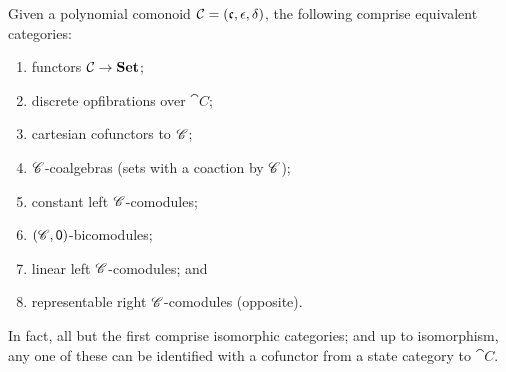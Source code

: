 \documentclass[Book-Poly]{subfiles}
\begin{document}
\begin{theorem}\label{thm.tfae_c_sets}
Given a polynomial comonoid $\mathcal{C}=(\mathfrak{c},\epsilon,\delta)$, the following comprise equivalent categories:
\begin{enumerate}
	\item functors $\mathcal{C}\to\mathbf{Set}$;
	\item discrete opfibrations over $\cat{C}$;
	\item cartesian cofunctors to $\mathscr{C}$;
	\item $\mathscr{C}$-coalgebras (sets with a coaction by $\mathscr{C}$);
	\item constant left $\mathscr{C}$-comodules;
	\item $(\mathscr{C},\textsf{0})$-bicomodules;
	\item linear left $\mathscr{C}$-comodules; and
	\item representable right $\mathscr{C}$-comodules (opposite).
\end{enumerate}
In fact, all but the first comprise isomorphic categories; and up to isomorphism, any one of these can be identified with a cofunctor from a state category to $\cat{C}$.
\end{theorem}
\end{document}
